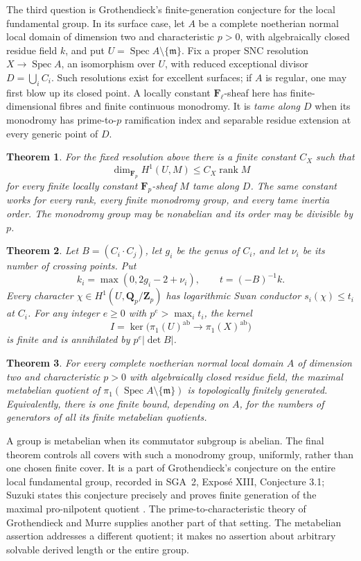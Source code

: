 \documentclass[11pt]{article}
\newtheorem{theorem}{Theorem}[section]
\theoremstyle{remark}\newtheorem{remark}[theorem]{Remark}
\newcommand{\F}{\mathbf F}
\newcommand{\Spec}{\operatorname{Spec}}
\begin{document}
The third question is Grothendieck's finite-generation conjecture for the local fundamental group. In its surface case, let $A$ be a complete noetherian normal local domain of dimension two and characteristic $p>0$, with algebraically closed residue field $k$, and put $U=\Spec A\setminus\{\mathfrak m\}$. Fix a proper SNC resolution $X\to\Spec A$, an isomorphism over $U$, with reduced exceptional divisor $D=\bigcup_iC_i$. Such resolutions exist for excellent surfaces; if $A$ is regular, one may first blow up its closed point. A locally constant $\F_\ell$-sheaf here has finite-dimensional fibres and finite continuous monodromy. It is \emph{tame along $D$} when its monodromy has prime-to-$p$ ramification index and separable residue extension at every generic point of $D$.

\begin{theorem}\label{thm:local-coefficients}
For the fixed resolution above there is a finite constant $C_X$ such that
\[
 \dim_{\F_p}H^1(U,M)\leq C_X\operatorname{rank}M
\]
for every finite locally constant $\F_p$-sheaf $M$ tame along $D$. The same constant works for every rank, every finite monodromy group, and every tame inertia order. The monodromy group may be nonabelian and its order may be divisible by $p$.
\end{theorem}

\begin{theorem}\label{thm:abelian-inertia}
Let $B=(C_i\cdot C_j)$, let $g_i$ be the genus of $C_i$, and let $\nu_i$ be its number of crossing points. Put
\[
 k_i=\max(0,2g_i-2+\nu_i),\qquad t=(-B)^{-1}k.
\]
Every character $\chi\in H^1(U,\mathbf Q_p/\mathbf Z_p)$ has logarithmic Swan conductor $s_i(\chi)\leq t_i$ at $C_i$. For any integer $e\geq0$ with $p^e>\max_i t_i$, the kernel
\[
 I=\ker\bigl(\pi_1(U)^{\mathrm{ab}}\to\pi_1(X)^{\mathrm{ab}}\bigr)
\]
is finite and is annihilated by $p^e|\det B|$.
\end{theorem}

\begin{theorem}\label{thm:metabelian}
For every complete noetherian normal local domain $A$ of dimension two and characteristic $p>0$ with algebraically closed residue field, the maximal metabelian quotient of $\pi_1(\Spec A\setminus\{\mathfrak m\})$ is topologically finitely generated. Equivalently, there is one finite bound, depending on $A$, for the numbers of generators of all its finite metabelian quotients.
\end{theorem}

A group is metabelian when its commutator subgroup is abelian. The final theorem controls all covers with such a monodromy group, uniformly, rather than one chosen finite cover. It is a part of Grothendieck's conjecture on the entire local fundamental group, recorded in SGA~2, Expos\'e XIII, Conjecture 3.1; Suzuki states this conjecture precisely and proves finite generation of the maximal pro-nilpotent quotient \cite[Conjecture 1.1 and Theorem 1.2, author pp.~1--2]{Suzuki}. The prime-to-characteristic theory of Grothendieck and Murre supplies another part of that setting. The metabelian assertion addresses a different quotient; it makes no assertion about arbitrary solvable derived length or the entire group.
\end{document}
